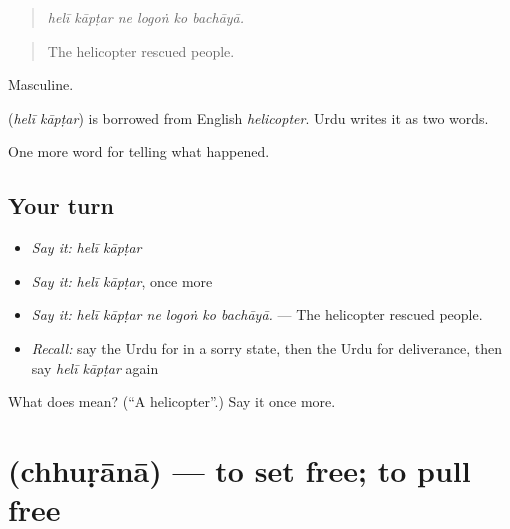 \begin{quote}
     
\end{quote}

\begin{quote}
\emph{helī kāpṭar ne logoṅ ko bachāyā.}
\end{quote}

\begin{quote}
The helicopter rescued people.
\end{quote}

Masculine.

\begin{cousinweb}
\textbf{ } (\emph{helī kāpṭar}) is borrowed from English \emph{helicopter}. Urdu writes it as two words.
\end{cousinweb}

\begin{grammarlens}[title={What you've built}]
One more word for telling what happened.
\end{grammarlens}

\subsection*{Your turn}
\begin{itemize}
\raggedright
  \item \emph{Say it:} \emph{helī kāpṭar}
  \item \emph{Say it:} \emph{helī kāpṭar}, once more
  \item \emph{Say it:} \emph{helī kāpṭar ne logoṅ ko bachāyā.} — The helicopter rescued people.
  \item \emph{Recall:} say the Urdu for in a sorry state, then the Urdu for deliverance, then say \emph{helī kāpṭar} again
\end{itemize}

\begin{tcolorbox}[breakable,colback=teal!4,colframe=teal!35!black,title={Before you move on}]
What does   mean? (\textquotedblleft{}A helicopter\textquotedblright{}.) Say it once more.
\end{tcolorbox}
\section[\texorpdfstring{\ur{چھڑانا} (chhuṛānā)}{چھڑانا (chhuṛānā)}]{ (chhuṛānā) — to set free; to pull free}

\label{lesson:UR-C296-chhurana}



